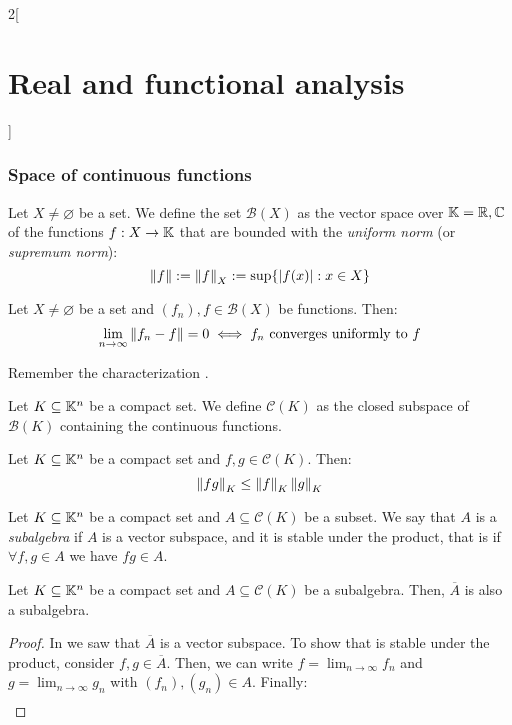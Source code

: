 \documentclass[../../../main_math.tex]{subfiles}
\begin{document}
\begin{multicols}{2}[\section{Real and functional analysis}]
  \subsubsection{Space of continuous functions}
  \begin{definition}
    Let $X\ne \varnothing$ be a set. We define the set $\mathcal{B}(X)$ as the vector space over $\mathbb{K}=\mathbb{R},\mathbb{C}$ of the functions $f:X\rightarrow\mathbb{K}$ that are bounded with the \emph{uniform norm} (or \emph{supremum norm}): $$\left\|f\right\|:=\left\|f\right\|_X:=\sup\{\abs{f(x)}:x\in X\}$$
  \end{definition}
  \begin{proposition}
    Let $X\ne \varnothing$ be a set and $(f_n),f\in\mathcal{B}(X)$ be functions. Then: $$\lim_{n\to\infty}\left\|f_n-f\right\|=0\iff f_n\text{ converges uniformly to }f$$
  \end{proposition}
  \begin{sproof}
    Remember the characterization .
  \end{sproof}
  \begin{definition}
    Let $K\subseteq \mathbb{K}^n$ be a compact set. We define $\mathcal{C}(K)$ as the closed subspace of $\mathcal{B}(K)$ containing the continuous functions.
  \end{definition}
  \begin{proposition}
    Let $K\subseteq \mathbb{K}^n$ be a compact set and $f,g\in\mathcal{C}(K)$. Then: $$\left\|fg\right\|_K\leq\left\|f\right\|_K\left\|g\right\|_K$$
  \end{proposition}
  \begin{definition}
    Let $K\subseteq \mathbb{K}^n$ be a compact set and $A\subseteq \mathcal{C}(K)$ be a subset. We say that $A$ is a \emph{subalgebra} if $A$ is a vector subspace, and it is stable under the product, that is if $\forall f,g\in A$ we have $fg\in A$.
  \end{definition}
  \begin{proposition}
    Let $K\subseteq \mathbb{K}^n$ be a compact set and $A\subseteq \mathcal{C}(K)$ be a subalgebra. Then, $\overline{A}$ is also a subalgebra.
  \end{proposition}
  \begin{proof}
    In  we saw that $\overline{A}$ is a vector subspace. To show that is stable under the product, consider $f,g\in\overline{A}$. Then, we can write $\displaystyle f=\lim_{n\to\infty} f_n$ and $\displaystyle g=\lim_{n\to\infty} g_n$ with $(f_n), (g_n)\in A$. Finally:
    \begin{align*}

\end{align*}
\end{proof}
\end{multicols}
\end{document}
